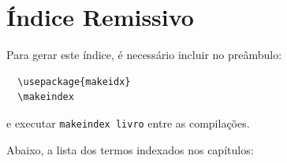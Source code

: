 \chapter{Índice Remissivo}
\label{apend:indice}


\ifdefined\printindex
  \printindex
\else
  \noindent Para gerar este índice, é necessário incluir no preâmbulo:
  \begin{verbatim}
  \usepackage{makeidx}
  \makeindex
  \end{verbatim}
  e executar \texttt{makeindex livro} entre as compilações.

  \bigskip
  \noindent Abaixo, a lista dos termos indexados nos capítulos:

